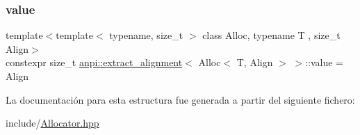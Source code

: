 \subsubsection{\texorpdfstring{value}{value}}
{\footnotesize\ttfamily template$<$template$<$ typename, size\+\_\+t $>$ class Alloc, typename T , size\+\_\+t Align$>$ \\
constexpr size\+\_\+t \hyperlink{structanpi_1_1extract__alignment}{anpi\+::extract\+\_\+alignment}$<$ Alloc$<$ T, Align $>$ $>$\+::value = Align\hspace{0.3cm}{\ttfamily [static]}}



La documentación para esta estructura fue generada a partir del siguiente fichero\+:\begin{DoxyCompactItemize}
\item 
include/\hyperlink{Allocator_8hpp}{Allocator.\+hpp}\end{DoxyCompactItemize}
